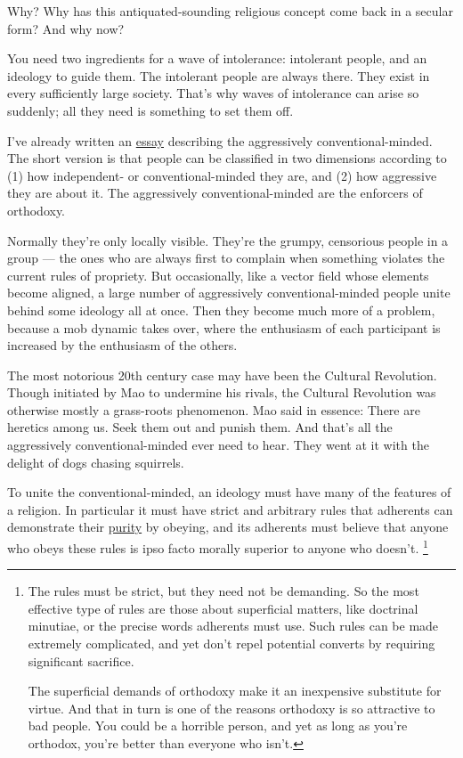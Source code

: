 Why? Why has this antiquated-sounding religious concept come back in a
secular form? And why now?

You need two ingredients for a wave of intolerance: intolerant people,
and an ideology to guide them. The intolerant people are always there.
They exist in every sufficiently large society. That's why waves of
intolerance can arise so suddenly; all they need is something to set
them off.

I've already written an \href{conformism.html}{essay} describing the
aggressively conventional-minded. The short version is that people can
be classified in two dimensions according to (1) how independent- or
conventional-minded they are, and (2) how aggressive they are about it.
The aggressively conventional-minded are the enforcers of orthodoxy.

Normally they're only locally visible. They're the grumpy, censorious
people in a group --- the ones who are always first to complain when
something violates the current rules of propriety. But occasionally,
like a vector field whose elements become aligned, a large number of
aggressively conventional-minded people unite behind some ideology all
at once. Then they become much more of a problem, because a mob dynamic
takes over, where the enthusiasm of each participant is increased by the
enthusiasm of the others.

The most notorious 20th century case may have been the Cultural
Revolution. Though initiated by Mao to undermine his rivals, the
Cultural Revolution was otherwise mostly a grass-roots phenomenon. Mao
said in essence: There are heretics among us. Seek them out and punish
them. And that's all the aggressively conventional-minded ever need to
hear. They went at it with the delight of dogs chasing squirrels.

To unite the conventional-minded, an ideology must have many of the
features of a religion. In particular it must have strict and arbitrary
rules that adherents can demonstrate their
\href{https://www.youtube.com/watch?v=qaHLd8de6nM}{purity} by obeying,
and its adherents must believe that anyone who obeys these rules is ipso
facto morally superior to anyone who doesn't. \footnote{The rules must be strict, but they need not be demanding. So the
most effective type of rules are those about superficial matters, like
doctrinal minutiae, or the precise words adherents must use. Such rules
can be made extremely complicated, and yet don't repel potential
converts by requiring significant sacrifice.

The superficial demands of orthodoxy make it an inexpensive substitute
for virtue. And that in turn is one of the reasons orthodoxy is so
attractive to bad people. You could be a horrible person, and yet as
long as you're orthodox, you're better than everyone who isn't.}


